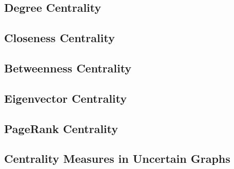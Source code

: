 \documentclass[\main/thesis.tex]{subfiles}
\begin{document}
\subsection{Degree Centrality}
\subsection{Closeness Centrality}
\subsection{Betweenness Centrality}
\subsection{Eigenvector Centrality}
\subsection{PageRank Centrality}
\subsection{Centrality Measures in Uncertain Graphs}
\end{document}

